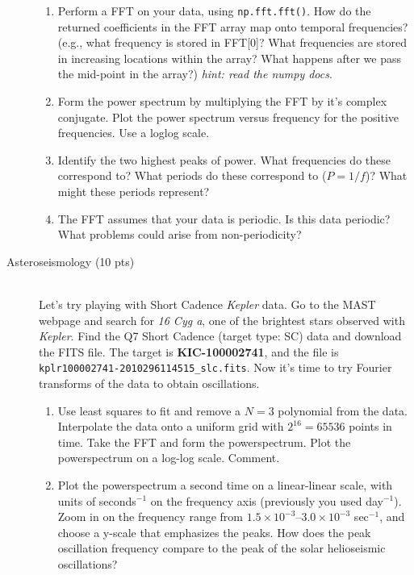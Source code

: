 \begin{description}
\begin{enumerate}
   \item Perform a FFT on your data, using \verb+np.fft.fft()+. 
     How do the returned coefficients in the FFT array 
     map onto temporal frequencies? (e.g., what frequency is stored in
     FFT[0]?  What frequencies are stored in increasing locations
     within the array?  What happens after we pass the mid-point in
     the array?) \emph{hint: read the numpy docs}.

   \item Form the power spectrum by multiplying the FFT by it's
     complex conjugate.  Plot the power spectrum versus frequency for
     the positive frequencies.
     Use a loglog scale.

   \item Identify the two highest peaks of power.  What frequencies
     do these correspond to?  What periods do these correspond to
     ($P=1/f$)?  What might these periods represent?

   \item The FFT assumes that your data is periodic.  Is this data
     periodic?  What problems could arise from non-periodicity?
\end{enumerate}

\item[Asteroseismology (10 pts)] ~\\
    Let's try playing with Short Cadence \emph{Kepler} data.  Go to
    the MAST webpage and search for \emph{16 Cyg a}, one of the brightest stars
    observed with \emph{Kepler}.  Find the Q7 Short Cadence (target
    type: SC) data and download the FITS file.  The target is
    \textbf{KIC-100002741}, and the file is \verb+kplr100002741-2010296114515_slc.fits+.
    Now it's time to try Fourier transforms of the data to obtain
    oscillations.
\begin{enumerate}
  \item  Use least squares to fit and remove a
     $N=3$ polynomial from the data.  Interpolate the data onto a
     uniform grid with $2^{16}=65536$ points in time.  Take the FFT
     and form the powerspectrum.  Plot the powerspectrum on a log-log
     scale.  Comment.  

     \item Plot the powerspectrum a second time on a
     linear-linear scale, with units of seconds$^{-1}$ on the frequency
     axis (previously you used day$^{-1}$).  Zoom in on the frequency range from
     $1.5\times 10^{-3}$--$3.0\times 10^{-3}$ sec$^{-1}$, and choose a y-scale
     that emphasizes the peaks.  How does the peak oscillation
     frequency compare to the peak of the solar helioseismic
     oscillations?  


\end{enumerate}
\end{description}
